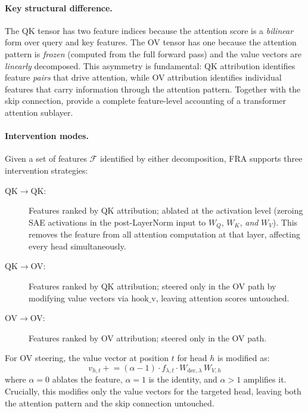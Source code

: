 \documentclass{article}
\theoremstyle{plain}
\theoremstyle{definition}
\theoremstyle{remark}
\newcommand{\WQ}{W_Q}
\newcommand{\WK}{W_K}
\newcommand{\WV}{W_V}
\begin{document}
\paragraph{Key structural difference.} The QK tensor has two feature indices because the attention score is a \emph{bilinear} form over query and key features. The OV tensor has one because the attention pattern is \emph{frozen} (computed from the full forward pass) and the value vectors are \emph{linearly} decomposed. This asymmetry is fundamental: QK attribution identifies feature \emph{pairs} that drive attention, while OV attribution identifies individual features that carry information through the attention pattern. Together with the skip connection,  provide a complete feature-level accounting of a transformer attention sublayer.

\paragraph{Intervention modes.} Given a set of features $\mathcal{F}$ identified by either decomposition, FRA supports three intervention strategies:
\begin{description}
    \item[QK$\to$QK:] Features ranked by QK attribution; ablated at the activation level (zeroing SAE activations in the post-LayerNorm input to $\WQ$, $\WK$, \emph{and} $\WV$). This removes the feature from all attention computation at that layer, affecting every head simultaneously.
    \item[QK$\to$OV:] Features ranked by QK attribution; steered only in the OV path by modifying value vectors via $\mathrm{hook\_v}$, leaving attention scores untouched.
    \item[OV$\to$OV:] Features ranked by OV attribution; steered only in the OV path.
\end{description}
For OV steering, the value vector at position $t$ for head $h$ is modified as:
\begin{equation}
    v_{h,t} \mathrel{+}= (\alpha - 1) \cdot f_{\lambda,t} \cdot W_{\mathrm{dec},\lambda}\,W_{V,h}
    \label{eq:ov_steer}
\end{equation}
where $\alpha = 0$ ablates the feature, $\alpha = 1$ is the identity, and $\alpha > 1$ amplifies it. Crucially, this modifies only the value vectors for the targeted head, leaving both the attention pattern and the skip connection untouched.


\end{document}

